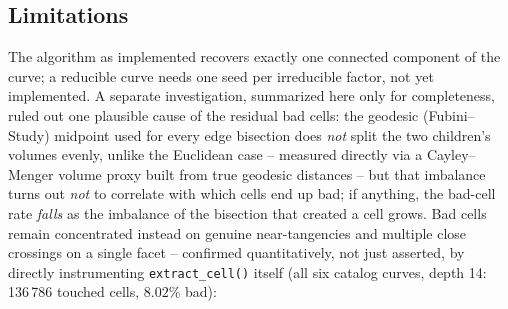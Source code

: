 \documentclass[11pt]{article}
\begin{document}
\subsection{Limitations}
\label{sec:limitations}

The algorithm as implemented recovers exactly one connected component of
the curve; a reducible curve needs one seed per irreducible factor, not
yet implemented. A separate investigation, summarized here only for
completeness, ruled out one plausible cause of the residual bad cells: the
geodesic (Fubini--Study) midpoint used for every edge bisection does
\emph{not} split the two children's volumes evenly, unlike the Euclidean
case -- measured directly via a Cayley--Menger volume proxy built from
true geodesic distances -- but that imbalance turns out \emph{not} to
correlate with which cells end up bad; if anything, the bad-cell rate
\emph{falls} as the imbalance of the bisection that created a cell grows.
Bad cells remain concentrated instead on genuine near-tangencies and
multiple close crossings on a single facet -- confirmed quantitatively,
not just asserted, by directly instrumenting \texttt{extract\_cell()}
itself (all six catalog curves, depth 14: 136\,786 touched cells, $8.02\%$
bad):
\end{document}
